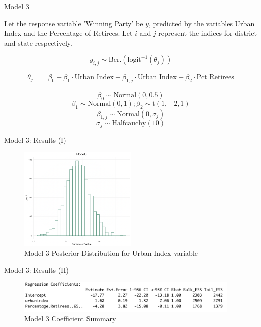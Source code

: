 \documentclass{beamer}
\begin{document}
\begin{frame}{Model 3}

    Let the response variable 'Winning Party' be \(y\), predicted by the variables Urban Index and the Percentage of Retirees. Let \(i\) and \(j\) represent the indices for district and state respectively.

    \[
    y_{i,j} \sim \text{Ber.}\left(\text{logit}^{-1}(\theta_{j})\right)
    \]

\[
\begin{aligned}
\theta_{j} =   &\beta_0 + \beta_1 \cdot \text{Urban\_Index} + \beta_{1,j} \cdot \text{Urban\_Index} + \beta_2 \cdot \text{Pct\_Retirees}
\end{aligned}
\]

    \[\beta_0 \sim \text{Normal}(0, 0.5)\]
    \[\beta_1 \sim \text{Normal}(0, 1); \beta_2 \sim \text{t}(1,-2,1)\]
    \[\beta_{1,j} \sim \text{Normal}(0, \sigma_j)\]
    \[ \sigma_j \sim \text{Halfcauchy}(10)\]

\end{frame}


\begin{frame}{Model 3: Results (I)}
    \begin{figure}
            \caption{Model 3 Posterior Distribution for Urban Index variable}
        \includegraphics[width=0.5\textwidth]{plots/model3_postui.png}
    \end{figure}

\end{frame}


\begin{frame}{Model 3: Results (II)}

    \begin{figure}
         \caption{Model 3 Coefficient Summary}
        \includegraphics[width=0.95\textwidth]{plots/model3_coeff.png}
    \end{figure}
\end{frame}
\end{document}
